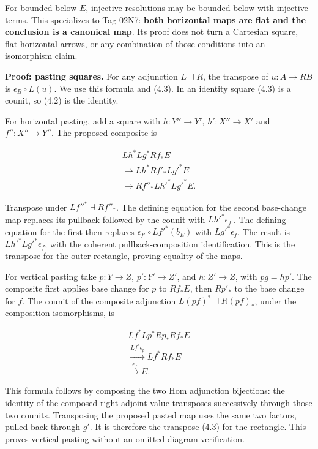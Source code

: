 \documentclass[
  english,
  11pt,
  a4paper,
]{article}
\begin{document}
For bounded-below \(E\), injective resolutions may be bounded below with
injective terms. This specializes to Tag 02N7: \textbf{both horizontal
maps are flat and the conclusion is a canonical map}. Its proof does not
turn a Cartesian square, flat horizontal arrows, or any combination of
those conditions into an isomorphism claim.

\textbf{Proof: pasting squares.} For any adjunction \(L\dashv R\), the
transpose of \(u:A\to RB\) is \(\epsilon_B\circ L(u)\). We use this
formula and (4.3). In an identity square (4.3) is a counit, so (4.2) is
the identity.

For horizontal pasting, add a square with \(h:Y''\to Y'\),
\(h':X''\to X'\) and \(f'':X''\to Y''\). The proposed composite is

\[\begin{gathered}
Lh^*Lg^*Rf_*E\\
\longrightarrow Lh^*Rf'_*Lg'^*E\\
\longrightarrow Rf''_*Lh'^*Lg'^*E.
\end{gathered}
\tag{4.7}\]

Transpose under \(Lf''^*\dashv Rf''_*\). The defining equation for the
second base-change map replaces its pullback followed by the counit with
\(Lh'^*\epsilon_{f'}\). The defining equation for the first then
replaces \(\epsilon_{f'}\circ Lf'^*(b_E)\) with \(Lg'^*\epsilon_f\). The
result is \(Lh'^*Lg'^*\epsilon_f\), with the coherent
pullback-composition identification. This is the transpose for the outer
rectangle, proving equality of the maps.

For vertical pasting take \(p:Y\to Z\), \(p':Y'\to Z'\), and
\(h:Z'\to Z\), with \(pg=hp'\). The composite first applies base change
for \(p\) to \(Rf_*E\), then \(Rp'_*\) to the base change for \(f\). The
counit of the composite adjunction \(L(pf)^*\dashv R(pf)_*\), under the
composition isomorphisms, is

\[\begin{gathered}
Lf^*Lp^*Rp_*Rf_*E\\
\xrightarrow{Lf^*\epsilon_p}Lf^*Rf_*E\\
\xrightarrow{\epsilon_f}E.
\end{gathered}
\tag{4.8}\]

This formula follows by composing the two Hom adjunction bijections: the
identity of the composed right-adjoint value transposes successively
through those two counits. Transposing the proposed pasted map uses the
same two factors, pulled back through \(g'\). It is therefore the
transpose (4.3) for the rectangle. This proves vertical pasting without
an omitted diagram verification.
\end{document}
